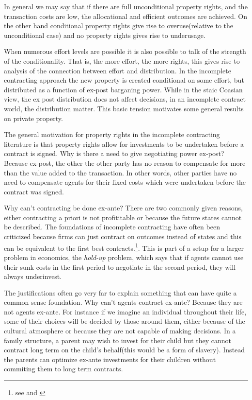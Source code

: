 \documentclass[12pt]{article}
\numberwithin{equation}{section}
\begin{document}
In general we may say that if there are full unconditional property rights, and the transaction costs are low, the allocational and efficient outcomes are achieved. On the other hand conditional property rights give rise to overuse(relative to the unconditional case) and no property rights gives rise to underusage. 

When numerous effort levels are possible it is also possible to talk of the strength of the conditionality. That is, the more effort, the more rights, this gives rise to analysis of the connection between effort and distribution. In the incomplete contracting approach the new property is created conditional on some effort, but distributed as a function of ex-post barganing power. While in the staic Coasian view, the ex post distribution does not affect decisions, in an incomplete contract world, the distribution matter. This basic tension motivates some general results on private property. 

The general motivation for property rights in the incomplete contracting literature is that property rights allow for investments to be undertaken before a contract is signed. Why is there a need to give negotiating power ex-post? Because ex-post, the other the other party has no reason to compensate for more than the value added to the transaction. In other words, other parties have no need to compensate agents for their fixed costs which were undertaken before the contract was signed. 

Why can't contracting be done ex-ante? There are two commonly given reasons, either contracting a priori is not profititable or because the future states cannot be described\cite{Hart1999}. The foundations of incomplete contracting have often been criticized because firms can just contract on outcomes instead of states and this can be equivalent to the first best contracts.\footnote{see \cite{Maskin2002} and \cite{maskin1999unforeseen}}. This is part of a setup for a larger problem in economics, the \textit{hold-up} problem, which says that if agents cannot use their sunk costs in the first period to negotiate in the second period, they will always underinvest. 

The justifications often go very far to explain something that can have quite a common sense foundation. Why can't agents contract ex-ante? Because they are not agents ex-ante. For instance if we imagine an individual throughout their life, some of their choices will be decided by those around them, either because of the cultural atmosphere or because they are not capable of making decisions. In a family structure, a parent may wish to invest for their child but they cannot contract long term on the child's behalf(this would be a form of slavery). Instead the parents can optimize ex-ante investments for their children without commiting them to long term contracts. 
\end{document}
